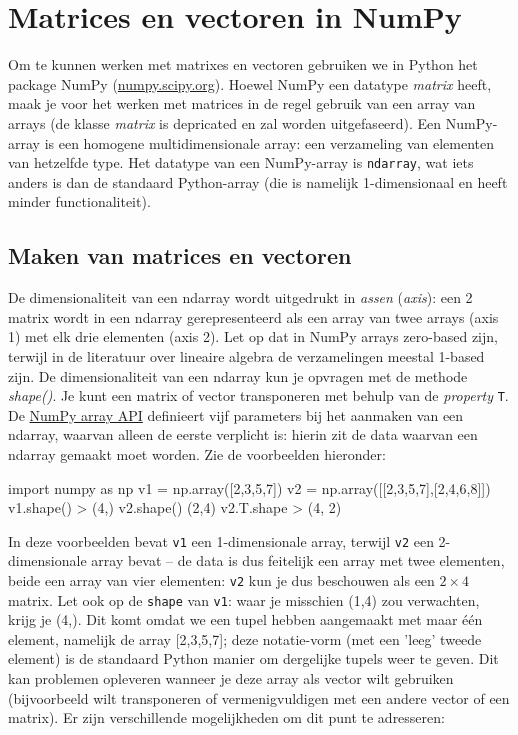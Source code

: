 
\section{Matrices en vectoren in NumPy}
Om te kunnen werken met matrixes en vectoren gebruiken we in Python het package NumPy (\url{numpy.scipy.org}). Hoewel NumPy een datatype \textit{matrix} heeft, maak je voor het werken met matrices in de regel gebruik van een array van arrays (de klasse \textit{matrix} is depricated en zal worden uitgefaseerd). Een NumPy-array is een homogene multidimensionale array: een verzameling van elementen van hetzelfde type. Het datatype van een NumPy-array is \texttt{ndarray}, wat iets anders is dan de standaard Python-array (die is namelijk 1-dimensionaal en heeft minder functionaliteit).

\subsection{Maken van matrices en vectoren}
De dimensionaliteit van een ndarray wordt uitgedrukt in \textit{assen} (\textit{axis}): een 2  matrix wordt in een ndarray gerepresenteerd als een array van twee arrays (axis 1) met elk drie elementen (axis 2). Let op dat in NumPy arrays zero-based zijn, terwijl in de literatuur over lineaire algebra de verzamelingen meestal 1-based zijn. De dimensionaliteit van een ndarray kun je opvragen met de methode \textit{shape()}. Je kunt een matrix of vector transponeren met behulp van de \textit{property} \texttt{T}. De \href{https://docs.scipy.org/doc/numpy/reference/generated/numpy.array.html}{NumPy array API} definieert vijf parameters bij het aanmaken van een ndarray, waarvan alleen de eerste verplicht is: hierin zit de data waarvan een ndarray gemaakt moet worden. Zie de voorbeelden hieronder:

\begin{python}
import numpy as np
v1 = np.array([2,3,5,7])
v2 = np.array([[2,3,5,7],[2,4,6,8]])
v1.shape()
> (4,)
v2.shape()
(2,4)
v2.T.shape
> (4, 2)
\end{python}

In deze voorbeelden bevat \texttt{v1} een 1-dimensionale array, terwijl \texttt{v2} een 2-dimensionale array bevat – de data is dus feitelijk een array met twee elementen, beide een array van vier elementen: \texttt{v2} kun je dus beschouwen als een $2 \times 4$ matrix. Let ook op de \texttt{shape} van \texttt{v1}: waar je misschien (1,4) zou verwachten, krijg je (4,). Dit komt omdat we een tupel hebben aangemaakt met maar één element, namelijk de array [2,3,5,7]; deze notatie-vorm (met een 'leeg' tweede element) is de standaard Python manier om dergelijke tupels weer te geven. Dit kan problemen opleveren wanneer je deze array als vector wilt gebruiken (bijvoorbeeld wilt transponeren of vermenigvuldigen met een andere vector of een matrix). Er zijn verschillende mogelijkheden om dit punt te adresseren:


